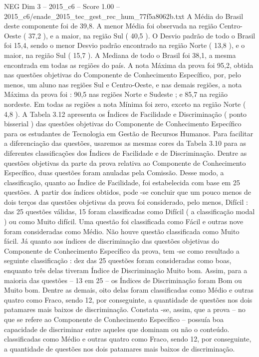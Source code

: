 \begin{textsample}{NEG Dim 3 – 2015\_c6 – Score 1.00 – 2015\_c6/enade\_2015\_tec\_gest\_rec\_hum\_77f5a8062b.txt}
A Média do Brasil deste componente foi de 39,8.
A menor Média foi observada na região Centro-Oeste ( 37,2 ), e a maior, na região Sul ( 40,5 ).
O Desvio padrão de todo o Brasil foi 15,4, sendo o menor Desvio padrão encontrado na região Norte ( 13,8 ), e o maior, na região Sul ( 15,7 ).
A Mediana de todo o Brasil foi 38,1, a mesma encontrada em todas as regiões do país.
A nota Máxima da prova foi 95,2, obtida nas questões objetivas do Componente de Conhecimento Específico, por, pelo menos, um aluno nas regiões Sul e Centro-Oeste, e nas demais regiões, a nota Máxima da prova foi : 90,5 nas regiões Norte e Sudeste ; e 85,7 na região nordeste.
Em todas as regiões a nota Mínima foi zero, exceto na região Norte ( 4,8 ).
A Tabela 3.12 apresenta os Índices de Facilidade e Discriminação ( ponto bisserial ) das questões objetivas do Componente de Conhecimento Específico para os estudantes de Tecnologia em Gestão de Recursos Humanos.
Para facilitar a diferenciação das questões, usaremos as mesmas cores da Tabela 3.10 para as diferentes classificações dos Índices de Facilidade e de Discriminação.
Dentre as questões objetivas da parte da prova relativa ao Componente de Conhecimento Específico, duas questões foram anuladas pela Comissão.
Desse modo, a classificação, quanto ao Índice de Facilidade, foi estabelecida com base em 25 questões.
A partir dos índices obtidos, pode -se concluir que um pouco menos de dois terços das questões objetivas da prova foi considerado, pelo menos, Difícil : das 25 questões válidas, 15 foram classificadas como Difícil ( a classificação modal ) ou como Muito difícil.
Uma questão foi classificada como Fácil e outras nove foram consideradas como Médio.
Não houve questão classificada como Muito fácil.
Já quanto aos índices de discriminação das questões objetivas do Componente de Conhecimento Específico da prova, tem -se como resultado a seguinte classificação : dez das 25 questões foram consideradas como boas, enquanto três delas tiveram Índice de Discriminação Muito bom.
Assim, para a maioria das questões – 13 em 25 – os Índices de Discriminação foram Bom ou Muito bom.
Dentre as demais, oito delas foram classificadas como Médio e outras quatro como Fraco, sendo 12, por conseguinte, a quantidade de questões nos dois patamares mais baixos de discriminação.
Constata -se, assim, que a prova – no que se refere ao Componente de Conhecimento Específico – possuía boa capacidade de discriminar entre aqueles que dominam ou não o conteúdo. classificadas como Médio e outras quatro como Fraco, sendo 12, por conseguinte, a quantidade de questões nos dois patamares mais baixos de discriminação.

\end{textsample}
